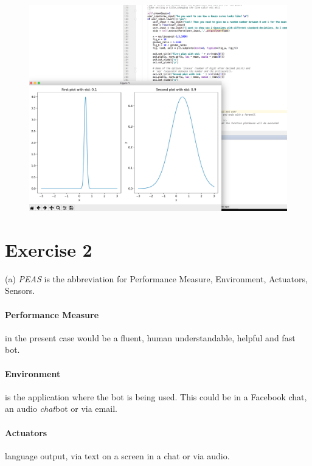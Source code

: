 \documentclass[11pt,a4paper,twoside]{article}
\begin{document}
\begin{figure}[btp]
	\centering
	\includegraphics[width=.8\textwidth]{figures/gauss.png}
	\label{gauss1}
\end{figure}

\section*{Exercise 2}
(a) \textit{PEAS} is the abbreviation for Performance Measure, Environment, Actuators, Sensors.
\paragraph{Performance Measure} in the present case would be a fluent, human understandable, helpful and fast bot.
\paragraph{Environment} is the application where the bot is being used. This could be in a Facebook chat, an audio \textit{chat}bot or via email.
\paragraph{Actuators} language output, via text on a screen in a chat or via audio.
\end{document}
